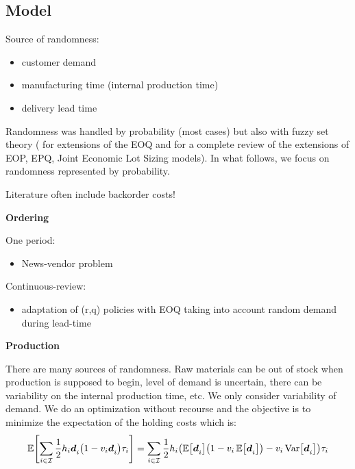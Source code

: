 \subsection{Model}

Source of randomness:
\begin{itemize}
  \item customer demand
  \item manufacturing time (internal production time)
  \item delivery lead time
\end{itemize}

Randomness was handled by probability (most cases) but also with fuzzy set theory (\eg \cite{Park1987,Lee1999,Wang2007} for extensions of the EOQ and \cite{Ziukov2015} for a complete review of the extensions of EOP, EPQ, Joint Economic Lot Sizing models). In what follows, we focus on randomness represented by probability.

Literature often include backorder costs!

\medskip

\textbf{Ordering}

One period:
\begin{itemize}
  \item News-vendor problem \cite{Edgeworth88,Arrow1951}
\end{itemize}

Continuous-review:
\begin{itemize}
  \item adaptation of (r,q) policies with EOQ taking into account random demand during lead-time \cite{Gallego1998}
\end{itemize}

\medskip

\textbf{Production}





There are many sources of randomness. Raw materials can be out of stock when production is supposed to begin, level of demand is uncertain, there can be variability on the internal production time, etc. We only consider variability of demand. We do an optimization without recourse and the objective is to minimize the expectation of the holding costs which is:
\begin{equation}
  \espe\sqbracket{\sum_{i\in\REF} \frac{1}{2}\holding_i\va\demand_i\bracket{1-\internal_i\va\demand_i}\cover_i}
  = 
  \sum_{i\in\REF} \frac{1}{2}\holding_i\bracket{\espe\sqbracket{\va\demand_i}\bracket{1-\internal_i\espe\sqbracket{\va\demand_i}}-\internal_i\vari\sqbracket{\va\demand_i}}\cover_i
\end{equation}

